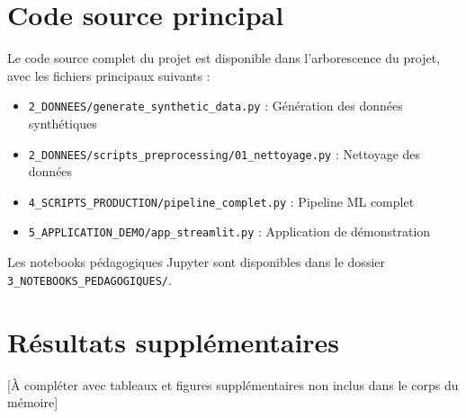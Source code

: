 \documentclass[12pt,a4paper,oneside]{report}
\begin{document}
\setcounter{page}{1}













\printbibliography[heading=bibintoc, title={Bibliographie}]

\appendix
\chapter{Code source principal}
\label{ann:code}

Le code source complet du projet est disponible dans l'arborescence du projet, avec les fichiers principaux suivants :

\begin{itemize}
    \item \texttt{2\_DONNEES/generate\_synthetic\_data.py} : Génération des données synthétiques
    \item \texttt{2\_DONNEES/scripts\_preprocessing/01\_nettoyage.py} : Nettoyage des données
    \item \texttt{4\_SCRIPTS\_PRODUCTION/pipeline\_complet.py} : Pipeline ML complet
    \item \texttt{5\_APPLICATION\_DEMO/app\_streamlit.py} : Application de démonstration
\end{itemize}

Les notebooks pédagogiques Jupyter sont disponibles dans le dossier \texttt{3\_NOTEBOOKS\_PEDAGOGIQUES/}.

\chapter{Résultats supplémentaires}
\label{ann:resultats}

[À compléter avec tableaux et figures supplémentaires non inclus dans le corps du mémoire]
\end{document}
